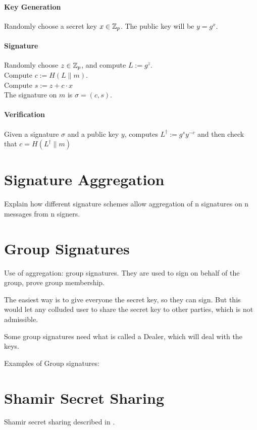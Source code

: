 \paragraph{Key Generation}

Randomly choose a secret key $x \in {\mathbb Z}_p$. The public key will be $y = g^x$.

\paragraph{Signature}
Randomly choose $z \in  {\mathbb Z}_p$, and compute $L := g^z$. \\
Compute $c := H(L \parallel m)$. \\
Compute $s := z + c \cdot x$ \\
The signature on $m$ is $\sigma = (c,s)$.

\paragraph{Verification}

Given a signature $\sigma$ and a public key $y$, computes $L^{\dagger} := g^{s} y^{-c}$ and then check that $c = H(L^{\dagger} \parallel m) $



\section{Signature Aggregation}
Explain how different signature schemes allow aggregation of n signatures on n messages from n signers.

\newpage
\section{Group Signatures}
Use of aggregation: group signatures. They are used to sign on behalf of the group, prove group membership.

The easiest way is to give everyone the secret key, so they can sign. But this would let any colluded user to share the secret key to other parties, which is not admissible.

Some group signatures need what is called a Dealer, which will deal with the keys.

Examples of Group signatures:

\section{Shamir Secret Sharing}
Shamir secret sharing described in \cite{Sham79}.

